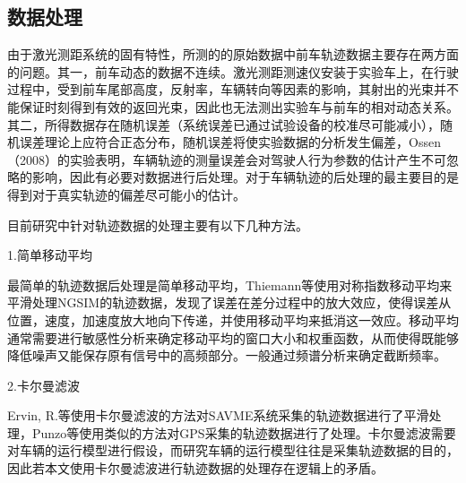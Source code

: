 \subsection{数据处理}


由于激光测距系统的固有特性，所测的的原始数据中前车轨迹数据主要存在两方面的问题。其一，前车动态的数据不连续。激光测距测速仪安装于实验车上，在行驶过程中，受到前车尾部高度，反射率，车辆转向等因素的影响，其射出的光束并不能保证时刻得到有效的返回光束，因此也无法测出实验车与前车的相对动态关系。其二，所得数据存在随机误差（系统误差已通过试验设备的校准尽可能减小），随机误差理论上应符合正态分布，随机误差将使实验数据的分析发生偏差，Ossen（2008）\cite{Ossen2008}的实验表明，车辆轨迹的测量误差会对驾驶人行为参数的估计产生不可忽略的影响，因此有必要对数据进行后处理。对于车辆轨迹的后处理的最主要目的是得到对于真实轨迹的偏差尽可能小的估计。

目前研究中针对轨迹数据的处理主要有以下几种方法。

1.简单移动平均


最简单的轨迹数据后处理是简单移动平均，Thiemann等\cite{Thiemann2008}使用对称指数移动平均来平滑处理NGSIM的轨迹数据，发现了误差在差分过程中的放大效应，使得误差从位置，速度，加速度放大地向下传递，并使用移动平均来抵消这一效应。移动平均通常需要进行敏感性分析来确定移动平均的窗口大小和权重函数，从而使得既能够降低噪声又能保存原有信号中的高频部分。一般通过频谱分析来确定截断频率。


2.卡尔曼滤波

Ervin, R.等\cite{Ervin2000}使用卡尔曼滤波的方法对SAVME系统采集的轨迹数据进行了平滑处理，Punzo等\cite{Punzo2009}使用类似的方法对GPS采集的轨迹数据进行了处理。卡尔曼滤波需要对车辆的运行模型进行假设，而研究车辆的运行模型往往是采集轨迹数据的目的，因此若本文使用卡尔曼滤波进行轨迹数据的处理存在逻辑上的矛盾。

